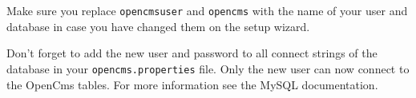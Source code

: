Make sure you replace \texttt{opencmsuser} and \texttt{opencms} with the name of your user and database 
in case you have changed them on the setup wizard.

Don't forget to add the new user and password to all connect
strings of the database in your \texttt{opencms.properties} file. 
Only the new user can now connect to the OpenCms tables. For more
information see the MySQL documentation.
